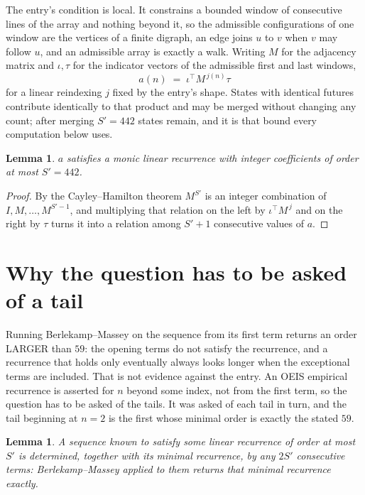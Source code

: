 \documentclass[11pt,a4paper]{article}
\theoremstyle{plain}
\newtheorem{lemma}[theorem]{Lemma}
\theoremstyle{definition}
\begin{document}
The entry's condition is local. It constrains a bounded window of consecutive lines of the
array and nothing beyond it, so the admissible configurations of one window are the vertices of
a finite digraph, an edge joins $u$ to $v$ when $v$ may follow $u$, and an admissible array is
exactly a walk. Writing $M$ for the adjacency matrix and $\iota,\tau$ for the indicator vectors
of the admissible first and last windows,
\[
a(n)\;=\;\iota^{\!\top}M^{\,j(n)}\tau
\]
for a linear reindexing $j$ fixed by the entry's shape. States with identical futures
contribute identically to that product and may be merged without changing any count; after
merging $S'=442$ states remain, and it is that bound every computation below uses.

\begin{lemma}\label{lem:cf}
$a$ satisfies a monic linear recurrence with integer coefficients of order at most $S'=442$.
\end{lemma}

\begin{proof}
By the Cayley--Hamilton theorem $M^{S'}$ is an integer combination of $I,M,\dots,M^{S'-1}$,
and multiplying that relation on the left by $\iota^{\!\top}M^{\,j}$ and on the right by
$\tau$ turns it into a relation among $S'+1$ consecutive values of $a$.
\end{proof}

\section{Why the question has to be asked of a tail}

Running Berlekamp--Massey on the sequence from its first term returns an order LARGER than $59$: the opening terms do not satisfy the recurrence, and a recurrence that holds only eventually always looks longer when the exceptional terms are included. That is not evidence against the entry. An OEIS empirical recurrence is asserted for $n$ beyond some index, not from the first term, so the question has to be asked of the tails. It was asked of each tail in turn, and the tail beginning at $n=2$ is the first whose minimal order is exactly the stated $59$.

\begin{lemma}\label{lem:bm}
A sequence known to satisfy some linear recurrence of order at most $S'$ is determined,
together with its minimal recurrence, by any $2S'$ consecutive terms: Berlekamp--Massey applied
to them returns that minimal recurrence exactly.
\end{lemma}
\end{document}

